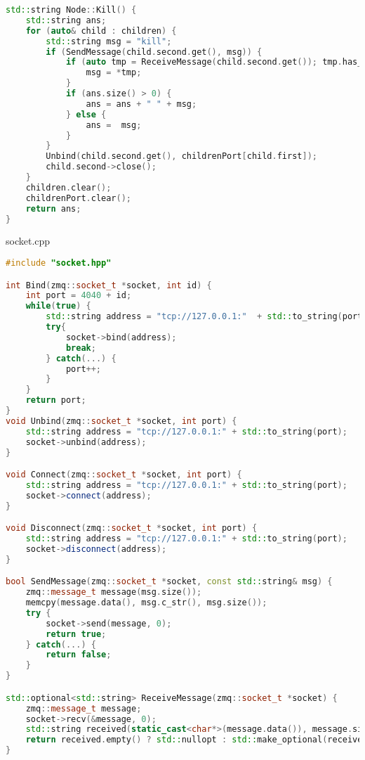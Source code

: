 \documentclass[a4paper, 12pt]{article}
\begin{document}
\begin{lstlisting}[language=C++]
std::string Node::Kill() {
    std::string ans;
    for (auto& child : children) {
        std::string msg = "kill";
        if (SendMessage(child.second.get(), msg)) {
            if (auto tmp = ReceiveMessage(child.second.get()); tmp.has_value()) {
                msg = *tmp;
            }
            if (ans.size() > 0) {
                ans = ans + " " + msg;
            } else {
                ans =  msg;
            }
        }
        Unbind(child.second.get(), childrenPort[child.first]);
        child.second->close();
    }
    children.clear();
    childrenPort.clear();
    return ans;
}
\end{lstlisting}

socket.cpp
\begin{lstlisting}[language=C++]
#include "socket.hpp"

int Bind(zmq::socket_t *socket, int id) {
    int port = 4040 + id;
    while(true) {
        std::string address = "tcp://127.0.0.1:"  + std::to_string(port);
        try{
            socket->bind(address);
            break;
        } catch(...) {
            port++;
        }    
    }
    return port;
}
void Unbind(zmq::socket_t *socket, int port) {
    std::string address = "tcp://127.0.0.1:" + std::to_string(port);
    socket->unbind(address);
}

void Connect(zmq::socket_t *socket, int port) {
    std::string address = "tcp://127.0.0.1:" + std::to_string(port);
    socket->connect(address);
}

void Disconnect(zmq::socket_t *socket, int port) {
    std::string address = "tcp://127.0.0.1:" + std::to_string(port);
    socket->disconnect(address);
}

bool SendMessage(zmq::socket_t *socket, const std::string& msg) {
    zmq::message_t message(msg.size());
    memcpy(message.data(), msg.c_str(), msg.size());
    try {
        socket->send(message, 0);
        return true;
    } catch(...) {
        return false;
    }
}

std::optional<std::string> ReceiveMessage(zmq::socket_t *socket) {
    zmq::message_t message;
    socket->recv(&message, 0);
    std::string received(static_cast<char*>(message.data()), message.size());
    return received.empty() ? std::nullopt : std::make_optional(received);
}
\end{lstlisting}
\end{document}
